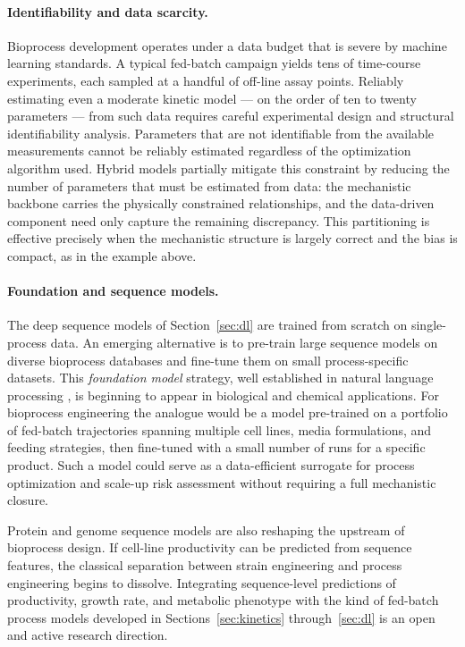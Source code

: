 \paragraph{Identifiability and data scarcity.}
Bioprocess development operates under a data budget that is severe by machine
learning standards.  A typical fed-batch campaign yields tens of time-course
experiments, each sampled at a handful of off-line assay points.  Reliably
estimating even a moderate kinetic model --- on the order of ten to twenty
parameters --- from such data requires careful experimental design and
structural identifiability analysis.  Parameters that are not identifiable from
the available measurements cannot be reliably estimated regardless of the
optimization algorithm used.  Hybrid models partially mitigate this constraint
by reducing the number of parameters that must be estimated from data: the
mechanistic backbone carries the physically constrained relationships, and the
data-driven component need only capture the remaining discrepancy.  This
partitioning is effective precisely when the mechanistic structure is largely
correct and the bias is compact, as in the example above.

\paragraph{Foundation and sequence models.}
The deep sequence models of Section~\ref{sec:dl} are trained from scratch on
single-process data.  An emerging alternative is to pre-train large sequence
models on diverse bioprocess databases and fine-tune them on small
process-specific datasets.  This \emph{foundation model} strategy, well
established in natural language processing \cite{Vaswani2017}, is beginning to
appear in biological and chemical applications.  For bioprocess engineering the
analogue would be a model pre-trained on a portfolio of fed-batch trajectories
spanning multiple cell lines, media formulations, and feeding strategies, then
fine-tuned with a small number of runs for a specific product.  Such a model
could serve as a data-efficient surrogate for process optimization and
scale-up risk assessment without requiring a full mechanistic closure.

Protein and genome sequence models \cite{Jumper2021} are also reshaping the
upstream of bioprocess design.  If cell-line productivity can be predicted
from sequence features, the classical separation between strain engineering
and process engineering begins to dissolve.  Integrating sequence-level
predictions of productivity, growth rate, and metabolic phenotype with the
kind of fed-batch process models developed in Sections~\ref{sec:kinetics}
through~\ref{sec:dl} is an open and active research direction.

